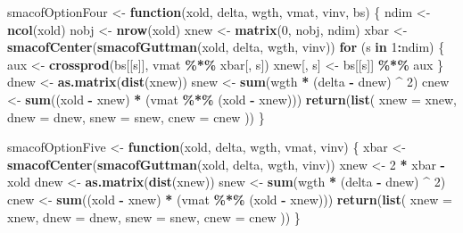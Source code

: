 \documentclass[
  12pt,
]{article}
\newenvironment{Shaded}{\begin{snugshade}}{\end{snugshade}}
\newcommand{\AttributeTok}[1]{\textcolor[rgb]{0.13,0.29,0.53}{#1}}
\newcommand{\ControlFlowTok}[1]{\textcolor[rgb]{0.13,0.29,0.53}{\textbf{#1}}}
\newcommand{\DecValTok}[1]{\textcolor[rgb]{0.00,0.00,0.81}{#1}}
\newcommand{\FunctionTok}[1]{\textcolor[rgb]{0.13,0.29,0.53}{\textbf{#1}}}
\newcommand{\NormalTok}[1]{#1}
\newcommand{\OtherTok}[1]{\textcolor[rgb]{0.56,0.35,0.01}{#1}}
\newcommand{\SpecialCharTok}[1]{\textcolor[rgb]{0.81,0.36,0.00}{\textbf{#1}}}
\begin{document}
\begin{Shaded}
\begin{Highlighting}[]
\NormalTok{smacofOptionFour }\OtherTok{\textless{}{-}} \ControlFlowTok{function}\NormalTok{(xold, delta, wgth, vmat, vinv, bs) \{}
\NormalTok{  ndim }\OtherTok{\textless{}{-}} \FunctionTok{ncol}\NormalTok{(xold)}
\NormalTok{  nobj }\OtherTok{\textless{}{-}} \FunctionTok{nrow}\NormalTok{(xold)}
\NormalTok{  xnew }\OtherTok{\textless{}{-}} \FunctionTok{matrix}\NormalTok{(}\DecValTok{0}\NormalTok{, nobj, ndim)}
\NormalTok{  xbar }\OtherTok{\textless{}{-}} \FunctionTok{smacofCenter}\NormalTok{(}\FunctionTok{smacofGuttman}\NormalTok{(xold, delta, wgth, vinv))}
  \ControlFlowTok{for}\NormalTok{ (s }\ControlFlowTok{in} \DecValTok{1}\SpecialCharTok{:}\NormalTok{ndim) \{}
\NormalTok{    aux }\OtherTok{\textless{}{-}} \FunctionTok{crossprod}\NormalTok{(bs[[s]], vmat }\SpecialCharTok{\%*\%}\NormalTok{ xbar[, s])}
\NormalTok{    xnew[, s] }\OtherTok{\textless{}{-}}\NormalTok{ bs[[s]] }\SpecialCharTok{\%*\%}\NormalTok{ aux}
\NormalTok{  \}}
\NormalTok{  dnew }\OtherTok{\textless{}{-}} \FunctionTok{as.matrix}\NormalTok{(}\FunctionTok{dist}\NormalTok{(xnew))}
\NormalTok{  snew }\OtherTok{\textless{}{-}} \FunctionTok{sum}\NormalTok{(wgth }\SpecialCharTok{*}\NormalTok{ (delta }\SpecialCharTok{{-}}\NormalTok{ dnew) }\SpecialCharTok{\^{}} \DecValTok{2}\NormalTok{)}
\NormalTok{  cnew }\OtherTok{\textless{}{-}} \FunctionTok{sum}\NormalTok{((xold }\SpecialCharTok{{-}}\NormalTok{ xnew) }\SpecialCharTok{*}\NormalTok{ (vmat }\SpecialCharTok{\%*\%}\NormalTok{ (xold }\SpecialCharTok{{-}}\NormalTok{ xnew)))}
  \FunctionTok{return}\NormalTok{(}\FunctionTok{list}\NormalTok{(}
    \AttributeTok{xnew =}\NormalTok{ xnew,}
    \AttributeTok{dnew =}\NormalTok{ dnew,}
    \AttributeTok{snew =}\NormalTok{ snew,}
    \AttributeTok{cnew =}\NormalTok{ cnew}
\NormalTok{  ))}
\NormalTok{\}}


\NormalTok{smacofOptionFive }\OtherTok{\textless{}{-}} \ControlFlowTok{function}\NormalTok{(xold, delta, wgth, vmat, vinv) \{}
\NormalTok{  xbar }\OtherTok{\textless{}{-}} \FunctionTok{smacofCenter}\NormalTok{(}\FunctionTok{smacofGuttman}\NormalTok{(xold, delta, wgth, vinv))}
\NormalTok{  xnew }\OtherTok{\textless{}{-}} \DecValTok{2} \SpecialCharTok{*}\NormalTok{ xbar }\SpecialCharTok{{-}}\NormalTok{ xold}
\NormalTok{  dnew }\OtherTok{\textless{}{-}} \FunctionTok{as.matrix}\NormalTok{(}\FunctionTok{dist}\NormalTok{(xnew))}
\NormalTok{  snew }\OtherTok{\textless{}{-}} \FunctionTok{sum}\NormalTok{(wgth }\SpecialCharTok{*}\NormalTok{ (delta }\SpecialCharTok{{-}}\NormalTok{ dnew) }\SpecialCharTok{\^{}} \DecValTok{2}\NormalTok{)}
\NormalTok{  cnew }\OtherTok{\textless{}{-}} \FunctionTok{sum}\NormalTok{((xold }\SpecialCharTok{{-}}\NormalTok{ xnew) }\SpecialCharTok{*}\NormalTok{ (vmat }\SpecialCharTok{\%*\%}\NormalTok{ (xold }\SpecialCharTok{{-}}\NormalTok{ xnew)))}
  \FunctionTok{return}\NormalTok{(}\FunctionTok{list}\NormalTok{(}
    \AttributeTok{xnew =}\NormalTok{ xnew,}
    \AttributeTok{dnew =}\NormalTok{ dnew,}
    \AttributeTok{snew =}\NormalTok{ snew,}
    \AttributeTok{cnew =}\NormalTok{ cnew}
\NormalTok{  ))}
\NormalTok{\}}


\end{Highlighting}
\end{Shaded}
\end{document}

